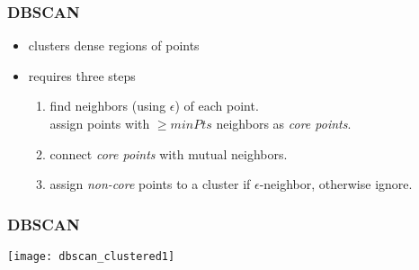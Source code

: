 \begin{frame}
\frametitle{DBSCAN}

\begin{itemize}
	\item clusters dense regions of points
	\item requires three steps {\scriptsize\cite{wiki:dbscan}\cite{dbscan:algorithmicthoughts}}
		\begin{enumerate}
		\itemsep 1em
			\item find neighbors (using $\epsilon$) of each point. \\ assign points with $\geq minPts$ neighbors as \textit{core points}.
		\item connect \textit{core points} with mutual neighbors.
		\item assign \textit{non-core} points to a cluster if $\epsilon$-neighbor, otherwise ignore.
		\end{enumerate}
\end{itemize}
\end{frame}

\begin{frame}
\frametitle{DBSCAN}

	{
	     \centering
	     \texttt{[image: dbscan\_clustered1]}
		\vfill
	}

\end{frame}